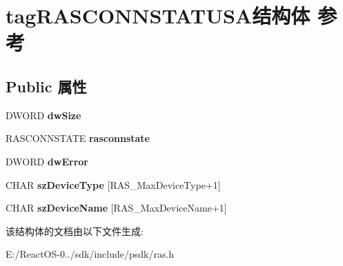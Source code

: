 \hypertarget{structtag_r_a_s_c_o_n_n_s_t_a_t_u_s_a}{}\section{tag\+R\+A\+S\+C\+O\+N\+N\+S\+T\+A\+T\+U\+S\+A结构体 参考}
\label{structtag_r_a_s_c_o_n_n_s_t_a_t_u_s_a}
\subsection*{Public 属性}
\begin{DoxyCompactItemize}
\item 
\mbox{\label{structtag_r_a_s_c_o_n_n_s_t_a_t_u_s_a_aca70b416c52db14ec90e87ece2e379fe}} 
D\+W\+O\+RD {\bfseries dw\+Size}
\item 
\mbox{\label{structtag_r_a_s_c_o_n_n_s_t_a_t_u_s_a_ace7369ab3dbb780e11be8caec98c6f66}} 
R\+A\+S\+C\+O\+N\+N\+S\+T\+A\+TE {\bfseries rasconnstate}
\item 
\mbox{\label{structtag_r_a_s_c_o_n_n_s_t_a_t_u_s_a_a4fb63c643abbf75d54902a32e5eebfb2}} 
D\+W\+O\+RD {\bfseries dw\+Error}
\item 
\mbox{\label{structtag_r_a_s_c_o_n_n_s_t_a_t_u_s_a_af7f510f5704706daadcf2e0b71270468}} 
C\+H\+AR {\bfseries sz\+Device\+Type} \mbox{[}R\+A\+S\+\_\+\+Max\+Device\+Type+1\mbox{]}
\item 
\mbox{\label{structtag_r_a_s_c_o_n_n_s_t_a_t_u_s_a_a3083c7851c724c5a46fa989e42da2a75}} 
C\+H\+AR {\bfseries sz\+Device\+Name} \mbox{[}R\+A\+S\+\_\+\+Max\+Device\+Name+1\mbox{]}
\end{DoxyCompactItemize}


该结构体的文档由以下文件生成\+:\begin{DoxyCompactItemize}
\item 
E\+:/\+React\+O\+S-\/0../sdk/include/psdk/ras.\+h\end{DoxyCompactItemize}

